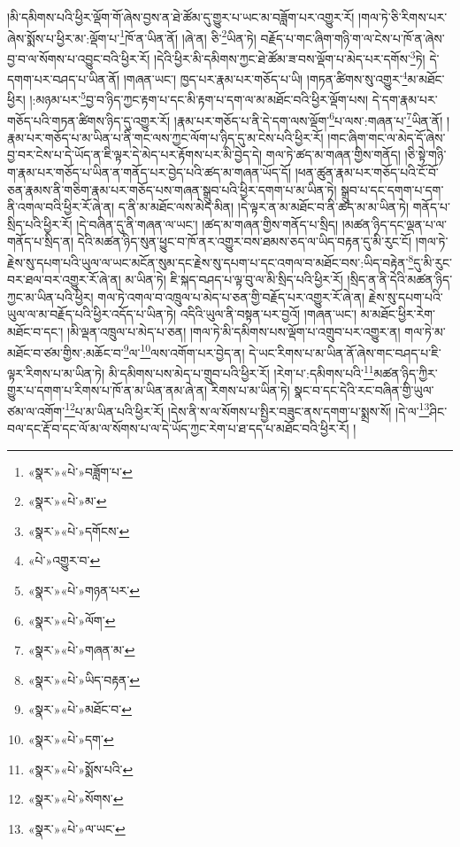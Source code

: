 །མི་དམིགས་པའི་ཕྱིར་ལྡོག་གོ་ཞེས་བྱས་ན་ཐེ་ཚོམ་དུ་གྱུར་པ་ཡང་མ་བཟློག་པར་འགྱུར་རོ། །གལ་ཏེ་ཅི་རིགས་པར་ཞེས་སྨོས་པ་ཕྱིར་མ་:ལྡོག་པ་\footnote{«སྣར་»«པེ་»བཟློག་པ་}ཁོ་ན་ཡིན་ནོ། །ཞེ་ན། ཅི་\footnote{«སྣར་»«པེ་»མ་}ཡིན་ཏེ། བརྗོད་པ་གང་ཞིག་གཉི་ག་ལ་ངེས་པ་ཁོ་ན་ཞེས་བྱ་བ་ལ་སོགས་པ་འབྱུང་བའི་ཕྱིར་རོ། །དེའི་ཕྱིར་མི་དམིགས་ཀྱང་ཐེ་ཚོམ་ཟ་བས་ལྡོག་པ་མེད་པར་དགོས་\footnote{«སྣར་»«པེ་»དགོངས་}ཏེ། དེ་དགག་པར་བཤད་པ་ཡིན་ནོ། །གཞན་ཡང་། ཁྱད་པར་རྣམ་པར་གཅོད་པ་ཡི། །གཏན་ཚིགས་སུ་འགྱུར་\footnote{«པེ་»འགྱུར་བ་}མ་མཐོང་ཕྱིར། །:མཉམ་པར་\footnote{«སྣར་»«པེ་»གཉན་པར་}བྱ་བ་ཉིད་ཀྱང་རྟག་པ་དང་མི་རྟག་པ་དག་ལ་མ་མཐོང་བའི་ཕྱིར་ལྡོག་པས། དེ་དག་རྣམ་པར་གཅོད་པའི་གཏན་ཚིགས་ཉིད་དུ་འགྱུར་རོ། །རྣམ་པར་གཅོད་པ་ནི་དེ་དག་ལས་ལྡོག་\footnote{«སྣར་»«པེ་»ལོག་}པ་ལས་:གཞན་པ་\footnote{«སྣར་»«པེ་»གཞན་མ་}ཡིན་ནོ། །རྣམ་པར་གཅོད་པ་མ་ཡིན་པ་ནི་གང་ལས་ཀྱང་ལོག་པ་ཉིད་དུ་མ་ངེས་པའི་ཕྱིར་རོ། །གང་ཞིག་གང་ལ་མེད་དོ་ཞེས་བྱ་བར་ངེས་པ་དེ་ཡོད་ན་ཇི་ལྟར་དེ་མེད་པར་རྟོགས་པར་མི་བྱེད་དེ། གལ་ཏེ་ཚད་མ་གཞན་གྱིས་གནོད། །ཅི་སྟེ་གཉི་ག་རྣམ་པར་གཅོད་པ་ཡིན་ན་གནོད་པར་བྱེད་པའི་ཚད་མ་གཞན་ཡོད་དོ། །ཕན་ཚུན་རྣམ་པར་གཅོད་པའི་ངོ་བོ་ཅན་རྣམས་ནི་གཅིག་རྣམ་པར་གཅོད་པས་གཞན་སྒྲུབ་པའི་ཕྱིར་དགག་པ་མ་ཡིན་ཏེ། སྒྲུབ་པ་དང་དགག་པ་དག་ནི་འགལ་བའི་ཕྱིར་རོ་ཞེ་ན། ད་ནི་མ་མཐོང་ལས་མེད་མིན། །དེ་ལྟར་ན་མ་མཐོང་བ་ནི་ཚད་མ་མ་ཡིན་ཏེ། གནོད་པ་སྲིད་པའི་ཕྱིར་རོ། །དེ་བཞིན་དུ་ནི་གཞན་ལ་ཡང་། །ཚད་མ་གཞན་གྱིས་གནོད་པ་སྲིད། །མཚན་ཉིད་དང་ལྡན་པ་ལ་གནོད་པ་སྲིད་ན། དེའི་མཚན་ཉིད་སུན་ཕྱུང་བ་ཁོ་ནར་འགྱུར་བས་ཐམས་ཅད་ལ་ཡིད་བརྟན་དུ་མི་རུང་ངོ། །གལ་ཏེ་རྗེས་སུ་དཔག་པའི་ཡུལ་ལ་ཡང་མངོན་སུམ་དང་རྗེས་སུ་དཔག་པ་དང་འགལ་བ་མཐོང་བས་:ཡིད་བརྟེན་\footnote{«སྣར་»«པེ་»ཡིད་བརྟན་}དུ་མི་རུང་བར་ཐལ་བར་འགྱུར་རོ་ཞེ་ན། མ་ཡིན་ཏེ། ཇི་སྐད་བཤད་པ་ལྟ་བུ་ལ་མི་སྲིད་པའི་ཕྱིར་རོ། །སྲིད་ན་ནི་དེའི་མཚན་ཉིད་ཀྱང་མ་ཡིན་པའི་ཕྱིར། གལ་ཏེ་འགལ་བ་འཁྲུལ་པ་མེད་པ་ཅན་གྱི་བརྗོད་པར་འགྱུར་རོ་ཞེ་ན། རྗེས་སུ་དཔག་པའི་ཡུལ་ལ་མ་བརྗོད་པའི་ཕྱིར་འདོད་པ་ཡིན་ཏེ། འདིའི་ཡུལ་ནི་བསྟན་པར་བྱའོ། །གཞན་ཡང་། མ་མཐོང་ཕྱིར་རེག་མཐོང་བ་དང་། །མི་ལྡན་འཁྲུལ་པ་མེད་པ་ཅན། །གལ་ཏེ་མི་དམིགས་པས་ལྡོག་པ་འགྲུབ་པར་འགྱུར་ན། གལ་ཏེ་མ་མཐོང་བ་ཙམ་གྱིས་:མཆོང་བ་\footnote{«སྣར་»«པེ་»མཐོང་བ་}ལ་\footnote{«སྣར་»«པེ་»དག་}ལས་འགོག་པར་བྱེད་ན། དེ་ཡང་རིགས་པ་མ་ཡིན་ནོ་ཞེས་གང་བཤད་པ་ཇི་ལྟར་རིགས་པ་མ་ཡིན་ཏེ། མི་དམིགས་པས་མེད་པ་གྲུབ་པའི་ཕྱིར་རོ། །རེག་པ་:དམིགས་པའི་\footnote{«སྣར་»«པེ་»སྨོས་པའི་}མཚན་ཉིད་ཀྱིར་གྱུར་པ་དགག་པ་རིགས་པ་ཁོ་ན་མ་ཡིན་ནམ་ཞེ་ན། རིགས་པ་མ་ཡིན་ཏེ། སྣང་བ་དང་དེའི་རང་བཞིན་གྱི་ཡུལ་ཙམ་ལ་འགོག་\footnote{«སྣར་»«པེ་»སོགས་}པ་མ་ཡིན་པའི་ཕྱིར་རོ། །དེས་ནི་ས་ལ་སོགས་པ་སྤྱིར་བཟུང་ནས་དགག་པ་སྨྲས་སོ། །དེ་ལ་\footnote{«སྣར་»«པེ་»ལ་ཡང་}ཤིང་བལ་དང་རྡོ་བ་དང་ལོ་མ་ལ་སོགས་པ་ལ་དེ་ཡོད་ཀྱང་རེག་པ་ཐ་དད་པ་མཐོང་བའི་ཕྱིར་རོ། །
